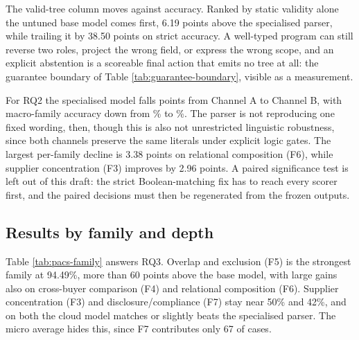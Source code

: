 The valid-tree column moves against accuracy.  Ranked by static validity alone the untuned base
model comes first, 6.19 points above the specialised parser, while trailing it by 38.50 points on
strict accuracy.  A well-typed program can still reverse two roles, project the wrong field, or
express the wrong scope, and an explicit abstention is a scoreable final action that emits no
tree at all: the guarantee boundary of Table \ref{tab:guarantee-boundary}, visible as a
measurement.

For RQ2 the specialised model falls \PacsSurfaceDrop{} points from Channel A to Channel B, with
macro-family accuracy down from \PacsMacroA\% to \PacsMacroB\%.  The parser is not reproducing one
fixed wording, then, though this is also not unrestricted linguistic robustness, since both
channels preserve the same literals under explicit logic gates.  The largest per-family decline is
3.38 points on relational composition (F6), while supplier concentration (F3) improves by 2.96
points.  A paired significance test is left out of this draft: the strict Boolean-matching fix has
to reach every scorer first, and the paired decisions must then be regenerated from the frozen
outputs.

\subsection{Results by family and depth}

Table \ref{tab:pacs-family} answers RQ3.  Overlap and exclusion (F5) is the strongest family at
94.49\%, more than 60 points above the base model, with large gains also on cross-buyer
comparison (F4) and relational composition (F6).  Supplier concentration (F3) and
disclosure/compliance (F7) stay near 50\% and 42\%, and on both the cloud model matches or
slightly beats the specialised parser.  The micro average hides this, since F7 contributes only
67 of \PacsN{} cases.

